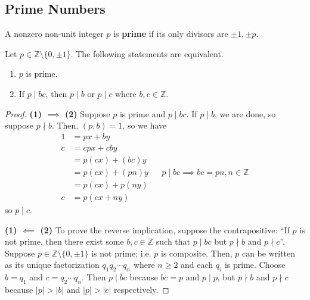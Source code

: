 \documentclass [12pt] {article}
\newcommand{\Z}{\mathbb{Z}}
\newenvironment{definition}[1]{\begin{tcolorbox}[title={Definition: #1},colback=blue!5!white,colframe=black!75!blue]}{\end{tcolorbox}}
\newenvironment{theorem}[1]{\begin{tcolorbox}[title={Theorem #1},colback=green!5!white,colframe=black!75!green]}{\end{tcolorbox}}
\renewcommand{\bf}[1]{\textbf{{#1}}}
\begin{document}
\subsection{Prime Numbers}
\begin{definition}{Prime}
    A nonzero non-unit integer $p$ is \bf{prime} if its only divisors are $\pm 1, \pm p$.
\end{definition}
 
\begin{theorem}{}
    Let $p \in \Z \setminus \{0, \pm 1\}$. The following statements are equivalent.
    \begin{enumerate}[label=(\arabic*)]
        \item $p$ is prime.
        \item If $p \mid bc$, then $p \mid b$ or $p \mid c$ where $b, c \in \Z$.
    \end{enumerate}
\end{theorem}
\begin{proof}
    \bf{(1) $\bm{\implies}$ (2)}
    Suppose $p$ is prime and $p \mid bc$. If $p \mid b$, we are done, so suppose $p \nmid b$. Then,
    $(p, b) = 1$, so we have
    \begin{align*}
        1 &= px + by \\ 
        c &= cpx + cby \\
          &= p(cx) + (bc)y \\
          &= p(cx) + (pn)y && p \mid bc \implies bc = pn, n \in \Z \\
          &= p(cx) + p(ny) \\
        c &= p(cx + ny)
    \end{align*}
    so $p \mid c$.
    \vspace{0.5em}

    \bf{(1) $\bm{\impliedby}$ (2)}
    To prove the reverse implication, suppose the contrapositive: ``If $p$ is not prime, then there
    exist some $b, c \in \Z$ such that $p \mid bc$ but $p \nmid b$ and $p \nmid c$''. Suppose 
    $p \in \Z \setminus \{ 0, \pm 1 \}$ is not prime; i.e. $p$ is composite. Then, $p$ can be
    written as its unique factorization $q_1 q_2 \cdots q_n$ where $n \geq 2$ and each $q_i$ is
    prime. Choose $b = q_1$ and $c = q_2 \cdots q_n$. Then $p \mid bc$ because $bc = p$ and 
    $p \mid p$, but $p \nmid b$ and $p \nmid c$ because $|p| > |b|$ and $|p| > |c|$ respectively.
\end{proof}
\end{document}
